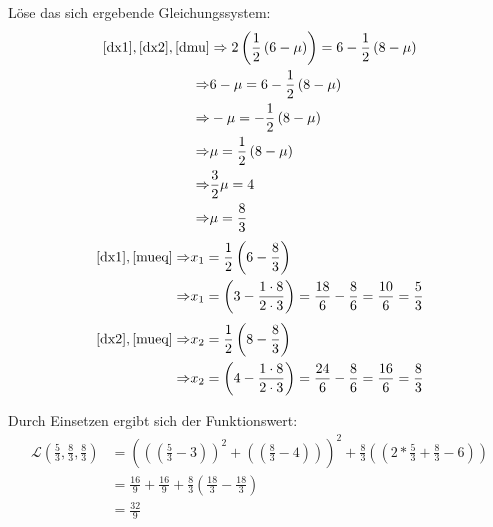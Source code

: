 \documentclass{article}
\begin{document}
Löse das sich ergebende Gleichungssystem:
\begin{equation}\label{mueq}
\begin{aligned}
    \eqref{dx1},\eqref{dx2},\eqref{dmu} &\Rightarrow 2\left( \frac{1}{2} \left(6 - \mu \right) \right) = 6 - \frac{1}{2} \left( 8-\mu \right)\\
    \Rightarrow & 6 - \mu  = 6 - \frac{1}{2} \left( 8-\mu \right)\\
    \Rightarrow &  - \mu  =  - \frac{1}{2} \left( 8-\mu \right)\\
    \Rightarrow &   \mu  =   \frac{1}{2} \left( 8-\mu \right)  \\
    \Rightarrow &   \frac{3}{2}\mu  =  4 \\
    \Rightarrow &   \mu  =  \frac{8}{3} \\
\end{aligned}
\end{equation}
\begin{equation}\label{x1eq}
\begin{aligned}
    \eqref{dx1},\eqref{mueq} \Rightarrow& x_1 = \frac{1}{2}\left(6-\frac{8}{3}\right)\\
    \Rightarrow & x_1 = \left(3-\frac{1 \cdot 8}{2\cdot 3}\right) = \frac{18}{6} -  \frac{8}{6} = \frac{10}{6} = \frac{5}{3}\\
\end{aligned}
\end{equation}
\begin{equation}\label{x2eq}
\begin{aligned}
    \eqref{dx2},\eqref{mueq} \Rightarrow& x_2 = \frac{1}{2}\left(8-\frac{8}{3}\right)\\
    \Rightarrow & x_2 = \left(4-\frac{1 \cdot 8}{2\cdot 3}\right) = \frac{24}{6} -  \frac{8}{6} = \frac{16}{6} = \frac{8}{3}\\
\end{aligned}
\end{equation}

Durch Einsetzen ergibt sich der Funktionswert:
\begin{equation}
\begin{aligned}
    \mathcal{L}\left(\frac{5}{3},\frac{8}{3},\frac{8}{3}\right) &=  \left(\left(\left(\frac{5}{3} - 3\right)\right)^2 + \left(\left(\frac{8}{3} -4\right)\right)\right)^2 + \frac{8}{3}\left(\left(2*\frac{5}{3} + \frac{8}{3} - 6 \right)\right)\\
    &=  \frac{16}{9} + \frac{16}{9} + \frac{8}{3} \left( \frac{18}{3} - \frac{18}{3} \right)\\
     &=  \frac{32}{9}
\end{aligned}
\end{equation}
\end{document}
